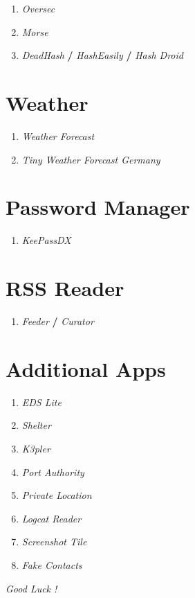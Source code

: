 \documentclass[12pt , a4paper]{article}
\begin{document}
\section{  }
\begin{enumerate}
	\item \emph{Oversec}
	\item \emph{Morse}
		\item \emph{DeadHash} \textbf{/} \emph{HashEasily} \textbf{/} \emph{Hash Droid}
\end{enumerate}

\section{Weather}
\begin{enumerate}
	\item \emph{Weather Forecast}
	\item \emph{Tiny Weather Forecast Germany}
\end{enumerate}

\section{Password Manager}
\begin{enumerate}
	\item[] \emph{KeePassDX}
\end{enumerate}

\section{RSS Reader}
\begin{enumerate}
	\item[] \emph{Feeder} \textbf{/} \emph{Curator}
\end{enumerate}

\section{Additional Apps}
\begin{enumerate}
	\item \emph{EDS Lite}
	\item \emph{Shelter}
	\item \emph{K3pler}
	\item \emph{Port Authority}
	\item \emph{Private Location}
	\item \emph{Logcat Reader}
	\item \emph{Screenshot Tile}
	\item \emph{Fake Contacts}
\end{enumerate}

\begin{center}
	\LARGE
	\emph{Good Luck !}
\end{center}
\end{document}
